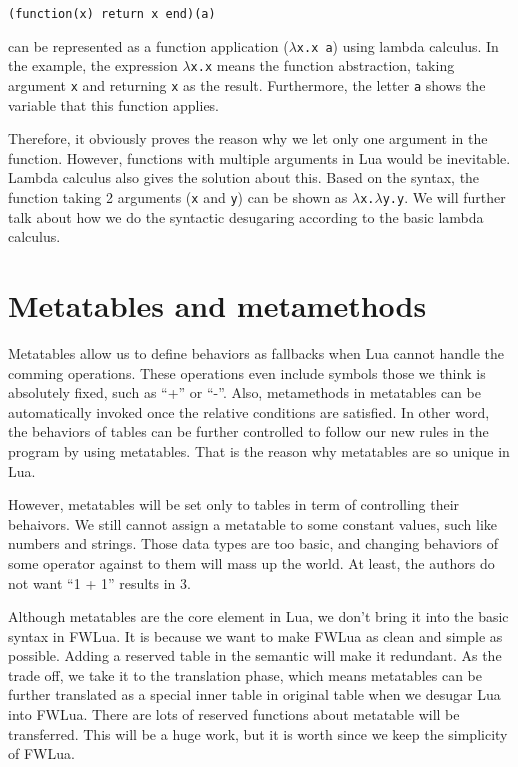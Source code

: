 \begin{verbatim}
(function(x) return x end)(a)
\end{verbatim}
can be represented as a function application ({\tt $\lambda$x.x a}) using lambda calculus. In the example, the expression {\tt $\lambda$x.x} means the function abstraction, taking argument {\tt x} and returning {\tt x} as the result. Furthermore, the letter {\tt a} shows the variable that this function applies.

Therefore, it obviously proves the reason why we let only one argument in the function. However, functions with multiple arguments in Lua would be inevitable. Lambda calculus also gives the solution about this. Based on the syntax, the function taking 2 arguments ({\tt x} and {\tt y}) can be shown as {\tt $\lambda$x.$\lambda$y.y}. We will further talk about how we do the syntactic desugaring according to the basic lambda calculus.

\newcommand{\abFunction}[2]{{\tt function} ~{#1}~{\tt return}~{#2}~{\tt end}}
\newcommand{\semanticFullRaw}[4]{{#1},{#2} \Downarrow {#3},{#4}}
\newcommand{\semanticFull}[4]{{#1},{#2} \Downarrow {#3}, {#4}}


\section{Metatables and metamethods}
Metatables allow us to define behaviors as fallbacks when Lua cannot handle the comming operations. These operations even include symbols those we think is absolutely fixed, such as ``+'' or ``-''.
Also, metamethods in metatables can be automatically invoked once the relative conditions are satisfied. In other word, the behaviors of tables can be further controlled to follow our new rules in the program by using metatables. That is the reason why metatables are so unique in Lua.

However, metatables will be set only to tables in term of controlling their behaivors. We still cannot assign a metatable to some constant values, such like numbers and strings. Those data types are too basic, and changing behaviors of some operator against to them will mass up the world. At least, the authors do not want ``1 + 1'' results in 3. 

Although metatables are the core element in Lua, we don't bring it into the basic syntax in FWLua.
It is because we want to make FWLua as clean and simple as possible. Adding a reserved table in the semantic will make it redundant.
As the trade off, we take it to the translation phase, which means metatables can be further translated as a special inner table in original table when we desugar Lua into FWLua. There are lots of reserved functions about metatable will be transferred. This will be a huge work, but it is worth since we keep the simplicity of FWLua.

